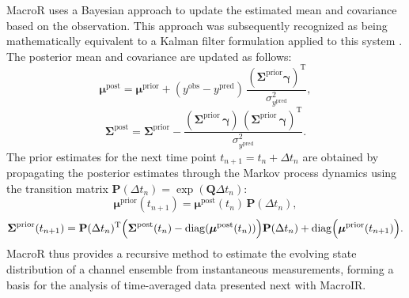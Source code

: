 \documentclass[pdflatex,sn-nature]{sn-jnl}%
\begin{document}
MacroR uses a Bayesian approach to update the estimated mean and covariance based on the observation. This approach was subsequently recognized as being mathematically equivalent to a Kalman filter formulation applied to this system \cite{stepanyuk2011efficient}. The posterior mean and covariance are updated as follows:
\begin{equation}
	\boldsymbol{\mu}^{\text{post}} = \boldsymbol{\mu}^{\text{prior}} + (y^{\text{obs}} - y^{\text{pred}})\, \frac{(\boldsymbol{\Sigma}^{\text{prior}} \boldsymbol{\gamma})^{\mathrm{T}}}{\sigma^2_{y^{\text{pred}}}},
	\label{eq:macro_mean_posterior} %
\end{equation}
\begin{equation}
	\boldsymbol{\Sigma}^{\text{post}} = \boldsymbol{\Sigma}^{\text{prior}} - \frac{(\boldsymbol{\Sigma}^{\text{prior}}\, \boldsymbol{\gamma})\, (\boldsymbol{\Sigma}^{\text{prior}}\, \boldsymbol{\gamma})^{\mathrm{T}}}{\sigma^2_{y^{\text{pred}}}}.
	\label{eq:macro_cov_posterior} %
\end{equation}
The prior estimates for the next time point \( t_{n+1} = t_n + \Delta t_n \) are obtained by propagating the posterior estimates through the Markov process dynamics using the transition matrix \( \mathbf{P}(\Delta t_n) = \exp(\boldsymbol{Q}\Delta t_n) \):
\begin{equation}
	\boldsymbol{\mu}^{\text{prior}}(t_{n+1}) = \boldsymbol{\mu}^{\text{post}}(t_n)\, \mathbf{P}(\Delta t_n),
	\label{eq:macro_mean_next_prior}
\end{equation}
\begin{equation}
	\boldsymbol{\Sigma}^{\text{prior}}(t_{n+1}) = \mathbf{P}(\Delta t_n)^{\mathrm{T}} \Bigl( \boldsymbol{\Sigma}^{\text{post}}(t_n) - \mathrm{diag}(\boldsymbol{\mu}^{\text{post}}(t_n)) \Bigr) \mathbf{P}(\Delta t_n) + \mathrm{diag}\Bigl(\boldsymbol{\mu}^{\text{prior}}(t_{n+1})\Bigr).
	\label{eq:macro_mean_next_cov} %
\end{equation}
MacroR thus provides a recursive method to estimate the evolving state distribution of a channel ensemble from instantaneous measurements, forming a basis for the analysis of time-averaged data presented next with MacroIR.

\end{document}
